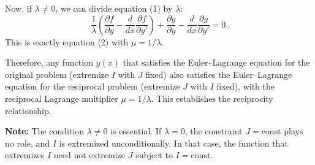\documentclass[12pt]{article}
\begin{document}
Now, if $\lambda \neq 0$, we can divide equation (1) by $\lambda$:
\[
  \frac{1}{\lambda}\left(\frac{\partial f}{\partial y} - \frac{d}{dx}\frac{\partial f}{\partial y'}\right) + \frac{\partial g}{\partial y} - \frac{d}{dx}\frac{\partial g}{\partial y'} = 0.
\]
This is exactly equation (2) with $\mu = 1/\lambda$.

Therefore, any function $y(x)$ that satisfies the Euler--Lagrange equation for the original problem (extremize $I$ with $J$ fixed) also satisfies the Euler--Lagrange equation for the reciprocal problem (extremize $J$ with $I$ fixed), with the reciprocal Lagrange multiplier $\mu = 1/\lambda$. This establishes the reciprocity relationship.

\medskip
\noindent\textbf{Note:} The condition $\lambda \neq 0$ is essential. If $\lambda = 0$, the constraint $J = \text{const}$ plays no role, and $I$ is extremized unconditionally. In that case, the function that extremizes $I$ need not extremize $J$ subject to $I = \text{const}$.
\end{document}
